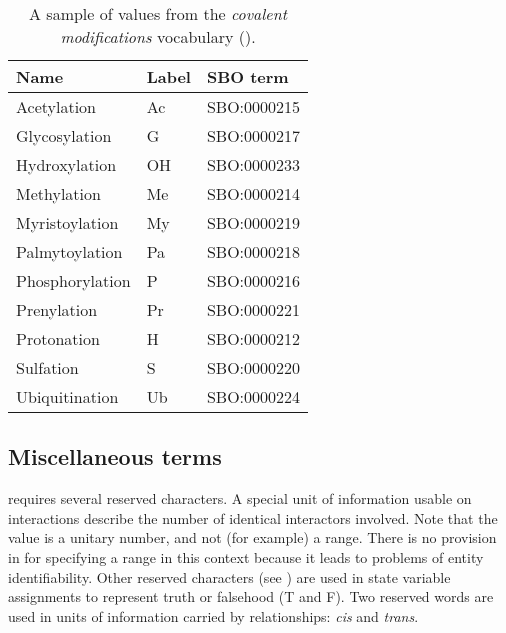 \begin{table}[ht]
  \centering
  \begin{tabular}{l>{\ttfamily}ll}
    \toprule
    \textbf{Name}   & \textbf{\rmfamily Label} & \textbf{SBO term} \\
    \midrule
    Acetylation     & Ac    & SBO:0000215\\
    Glycosylation   & G     & SBO:0000217\\
    Hydroxylation   & OH    & SBO:0000233\\
    Methylation     & Me    & SBO:0000214\\
    Myristoylation  & My    & SBO:0000219\\
    Palmytoylation  & Pa    & SBO:0000218\\
    Phosphorylation & P     & SBO:0000216\\
    Prenylation     & Pr    & SBO:0000221\\
    Protonation     & H     & SBO:0000212\\
    Sulfation       & S     & SBO:0000220\\
    Ubiquitination  & Ub    & SBO:0000224\\
    \bottomrule
  \end{tabular}
  \caption{A sample of values from the \emph{covalent modifications} vocabulary
    ().}
  \label{tab:covalent-mod-cv}
\end{table}

\subsection{Miscellaneous terms}
\label{sec:miscellaneous-cv}

\SBGNERLone requires several reserved characters. A special unit of information usable on interactions describe the number of identical interactors involved. Note that the value is a unitary number, and not (for example) a range.  There is no provision in \SBGNERLone for specifying a range in this context because it leads to problems of entity identifiability. Other reserved characters (see ) are used in state variable assignments to represent truth or falsehood (T and F). Two reserved words are used in units of information carried by relationships: \emph{cis} and \emph{trans}. 

